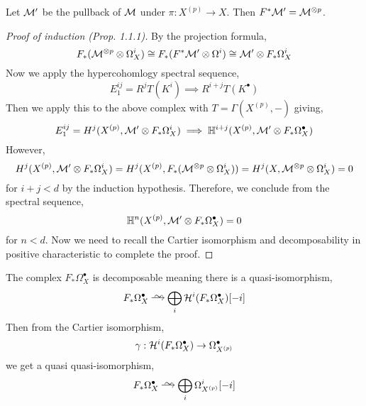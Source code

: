\documentclass[12pt]{article}
\begin{document}
\begin{cor}
Let $\mathcal{M}'$ be the pullback of $\mathcal{M}$ under $\pi : X^{(p)} \to X$. Then $F^* \mathcal{M}' = \mathcal{M}^{\otimes p}$. 
\end{cor}

\begin{proof}[Proof of induction (Prop. 1.1.1)]
By the projection formula,
\[ F_*(\mathcal{M}^{\otimes p} \otimes \Omega^i_X) \cong F_*(F^* \mathcal{M}' \otimes \Omega^i) \cong \mathcal{M}' \otimes F_* \Omega_X^i \] 
Now we apply the hypercohomlogy spectral sequence,
\[ E^{ij}_1 = R^j T(K^i) \implies R^{i+j} T(K^\bullet) \]
Then we apply this to the above complex with $T = \Gamma(X^{(p)}, -)$ giving,
\[ E^{ij}_1 = H^j(X^{(p)}, \mathcal{M}' \otimes F_* \Omega^i_X) \implies \mathbb{H}^{i+j}(X^{(p)}, \mathcal{M}' \otimes F_* \Omega^\bullet_X) \]
However,
\[ H^j(X^{(p)}, \mathcal{M}' \otimes F_* \Omega^i_X) = H^j(X^{(p)}, F_*(\mathcal{M}^{\otimes p} \otimes \Omega_X^i)) = H^j(X, \mathcal{M}^{\otimes p} \otimes \Omega^i_X) = 0 \]
for $i + j < d$ by the induction hypothesis. Therefore, we conclude from the spectral sequence,
\[ \mathbb{H}^{n}(X^{(p)}, \mathcal{M}' \otimes F_* \Omega^\bullet_X) = 0 \]
for $n < d$. Now we need to recall the Cartier isomorphism and decomposability in positive characteristic to complete the proof.
\end{proof}

\begin{prop}
The complex $F_* \Omega^\bullet_X$ is decomposable meaning there is a quasi-isomorphism,
\[ F_* \Omega^\bullet_X \iso \bigoplus_{i} \cH^i(F_* \Omega^\bullet_X )[-i] \]
Then from the Cartier isomorphism,
\[ \gamma : \mathcal{H}^i(F_* \Omega^\bullet_X) \to \Omega^\bullet_{X^{(p)}} \]
we get a quasi quasi-isomorphism,
\[ F_* \Omega^\bullet_{X} \iso \bigoplus_i \Omega^i_{X^{(p)}} [-i] \]
\end{prop}
\end{document}
